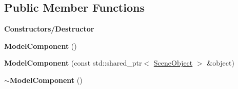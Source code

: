 \subsection*{Public Member Functions}
\begin{Indent}\textbf{ Constructors/\+Destructor}\par
\begin{DoxyCompactItemize}
\item 
\mbox{\label{classrev_1_1_model_component_a9d5f6ac22fd892163a24ba45d922e0f1}} 
{\bfseries Model\+Component} ()
\item 
\mbox{\label{classrev_1_1_model_component_a1606c06b3f12dd6f8cb31b7367e77d93}} 
{\bfseries Model\+Component} (const std\+::shared\+\_\+ptr$<$ \mbox{\hyperlink{classrev_1_1_scene_object}{Scene\+Object}} $>$ \&object)
\item 
\mbox{\label{classrev_1_1_model_component_aa5a21e0a945ac53ca475343a2b5d2898}} 
{\bfseries $\sim$\+Model\+Component} ()
\end{DoxyCompactItemize}
\end{Indent}
